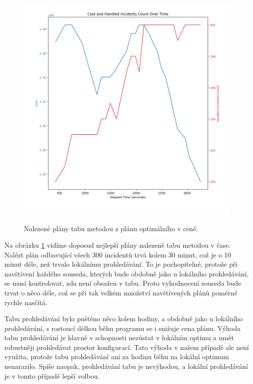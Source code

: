 \begin{figure}[H]
  \caption{Nalezené plány tabu metodou z plánu optimálního v ceně.}
  \includegraphics[width=\textwidth]{img/prague_hybrid_tabu.png}
  \centering
  \label{img:hybrid_tabu}
\end{figure}

Na obrázku \ref{img:hybrid_tabu} vidíme doposud nejlepší plány nalezené tabu metodou v čase.
Nalézt plán odbavující všech 300 incidentů trvá kolem 30 minut, což je o 10 minut déle, než trvalo lokálnímu prohledávání. 
To je pochopitelné, protože při navštívení každého souseda, kterých bude obdobně jako u lokálního prohledávání, se musí kontrolovat,
zda není obsažen v tabu. Proto vyhodnocení souseda bude trvat o něco déle, což se při tak velkém množství navštívených plánů poměrně rychle nasčítá.

Tabu prohledávání bylo puštěno něco kolem hodiny, a obdobně jako u lokálního prohledávání, s rostoucí délkou běhu programu se i snižuje cena plánu.
Výhoda tabu prohledávání je hlavně v schopnosti nezůstat v lokálním optimu a umět robustněji prohledávat prostor konfigurací.
Tato výhoda v našem případě ale není využita, protože tabu prohledávání ani za hodinu běhu na lokální optimum nenarazilo.
Spíše naopak, prohledávání tabu je nevýhodou, a lokální prohledávání je v tomto případě lepší volbou.

